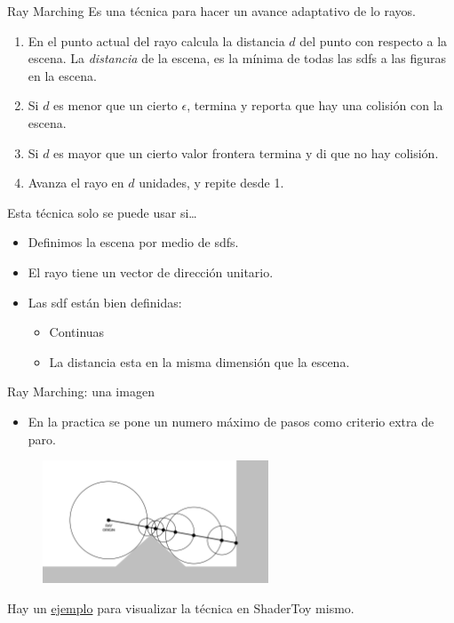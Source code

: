 \begin{frame}{Ray Marching}
Es una técnica para hacer un avance adaptativo de lo rayos.
\begin{enumerate}
    \item En el punto actual del rayo calcula la distancia $d$ del punto con respecto a la escena.
    La \emph{distancia} de la escena, es la mínima de todas las sdfs a las figuras en la escena.
    \item Si $d$ es menor que un cierto $\epsilon$, termina y reporta que hay una colisión con la escena.
    \item Si $d$ es mayor que un cierto valor frontera termina y di que no hay colisión.
    \item Avanza el rayo en $d$ unidades, y repite desde 1.
\end{enumerate}
Esta técnica solo se puede usar si\ldots
\begin{itemize}
    \item Definimos la escena por medio de sdfs.
    \item El rayo tiene un vector de dirección unitario.
    \item Las sdf están bien definidas:
    \begin{itemize}
        \item Continuas
        \item La distancia esta en la misma dimensión que la escena.
    \end{itemize}    
\end{itemize}

\end{frame}

\begin{frame}{Ray Marching: una imagen}

\begin{itemize}
    \item En la practica se pone un numero máximo de pasos como criterio extra de paro.
\end{itemize}    

\begin{figure}[htp]
    \centering
    \includegraphics[width=0.6\textwidth]{img/rayMarch}    
\end{figure}

Hay un \href{https://www.shadertoy.com/view/4dSfRc}{ejemplo} para visualizar la técnica en ShaderToy mismo.

\end{frame}

